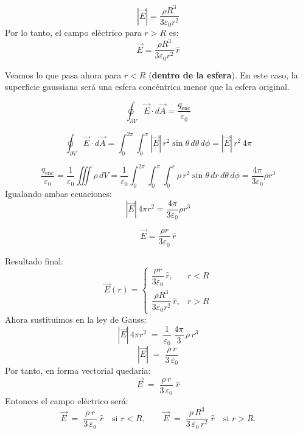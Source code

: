\documentclass[a4paper,12pt]{article}
\begin{document}
\[
|\vec E| = \frac{\rho R^{3}}{3\varepsilon_0 r^{2}}
\]
Por lo tanto, el campo eléctrico para \(r > R\) es:
\[
\boxed{\vec E = \frac{\rho R^{3}}{3\varepsilon_0 r^{2}}\,\hat r }
\]

\bigskip
\noindent
Veamos lo que pasa ahora para \(r < R\) (\textbf{dentro de la esfera}).  
En este caso, la superficie gaussiana será una esfera concéntrica menor que la esfera original.

\[
\oint_{\partial V}\vec E\cdot d\vec A = \frac{q_{\text{enc}}}{\varepsilon_0}
\]

\[
\oint_{\partial V}\vec E\cdot d\vec A = \int_0^{2\pi}\int_0^{\pi} |\vec E|\, r^{2}\sin\theta\, d\theta\, d\phi = |\vec E|\,r^{2}\,4\pi
\]

\[
\frac{q_{\text{enc}}}{\varepsilon_0} = \frac{1}{\varepsilon_0}\iiint \rho\, dV = \frac{1}{\varepsilon_0}\int_0^{2\pi}\int_0^{\pi}\int_0^{r} \rho\, r^{2}\sin\theta\, dr\, d\theta\, d\phi = \frac{4\pi}{3\varepsilon_0}\rho r^{3}
\]
Igualando ambas ecuaciones:
\[
|\vec E|\,4\pi r^{2} = \frac{4\pi}{3\varepsilon_0}\rho r^{3}
\]

\[
\boxed{\vec E = \frac{\rho r}{3\varepsilon_0}\,\hat r }
\]

\bigskip
\noindent
Resultado final:
\[
\vec E(r) =
\begin{cases}
\dfrac{\rho r}{3\varepsilon_0}\,\hat r, & r < R \\
\dfrac{\rho R^{3}}{3\varepsilon_0 r^{2}}\,\hat r, & r > R
\end{cases}
\]
\newpage
\noindent
Ahora sustituimos en la ley de Gauss:
\[
|\vec E|\,4\pi r^{2} \;=\; \frac{1}{\varepsilon_{0}}\;\frac{4\pi}{3}\,\rho\,r^{3}
\]
\[
|\vec E| \;=\; \frac{\rho\,r}{3\,\varepsilon_{0}}
\]
Por tanto, en forma vectorial quedaría:
\[
\vec E \;=\; \frac{\rho\,r}{3\,\varepsilon_{0}}\;\hat r
\]
Entonces el campo eléctrico será:
\[
\vec E \;=\; \frac{\rho\,r}{3\,\varepsilon_{0}}\;\hat r \quad \text{si } r<R,
\qquad
\vec E \;=\; \frac{\rho\,R^{3}}{3\,\varepsilon_{0}\,r^{2}}\;\hat r \quad \text{si } r>R.
\]
\end{document}
